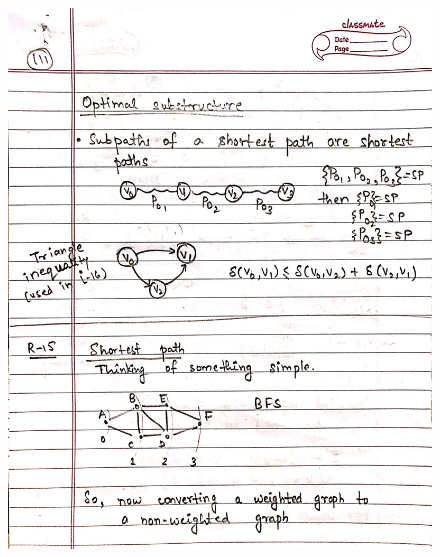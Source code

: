\begin{figure}[H]
    \centering
    \includegraphics[scale=0.25]{"./MIT-6.006/MIT-6006-111"}
\end{figure}
\newpage
